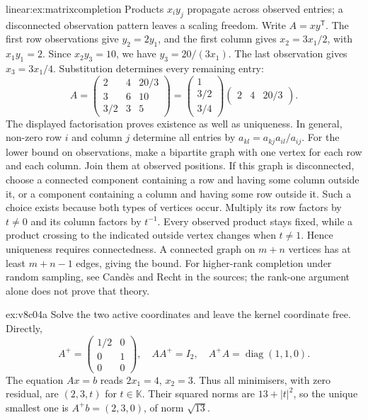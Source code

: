 \begin{solution}{linear:ex:matrixcompletion}
\idea Products $x_iy_j$ propagate across observed entries; a disconnected observation pattern leaves a scaling freedom.
\writeup Write $A=xy^{\mathsf T}$. The first row observations give $y_2=2y_1$, and the first column gives $x_2=3x_1/2$, with $x_1y_1=2$. Since $x_2y_3=10$, we have $y_3=20/(3x_1)$. The last observation gives $x_3=3x_1/4$. Substitution determines every remaining entry:
\[
A=\begin{pmatrix}2&4&20/3\\3&6&10\\3/2&3&5\end{pmatrix}
=\begin{pmatrix}1\\3/2\\3/4\end{pmatrix}\begin{pmatrix}2&4&20/3\end{pmatrix}.
\]
The displayed factorisation proves existence as well as uniqueness.
In general, non-zero row $i$ and column $j$ determine all entries by $a_{kl}=a_{kj}a_{il}/a_{ij}$. For the lower bound on observations, make a bipartite graph with one vertex for each row and each column. Join them at observed positions. If this graph is disconnected, choose a connected component containing a row and having some column outside it, or a component containing a column and having some row outside it. Such a choice exists because both types of vertices occur. Multiply its row factors by $t\ne0$ and its column factors by $t^{-1}$. Every observed product stays fixed, while a product crossing to the indicated outside vertex changes when $t\ne1$. Hence uniqueness requires connectedness. A connected graph on $m+n$ vertices has at least $m+n-1$ edges, giving the bound. For higher-rank completion under random sampling, see Cand\`es and Recht in the sources; the rank-one argument alone does not prove that theory.
\end{solution}

\begin{solution}{ex:v8c04a}
\idea Solve the two active coordinates and leave the kernel coordinate free.
\writeup Directly,
\[
A^+=\begin{pmatrix}1/2&0\\0&1\\0&0\end{pmatrix},\quad
AA^+=I_2,\quad A^+A=\operatorname{diag}(1,1,0).
\]
The equation $Ax=b$ reads $2x_1=4$, $x_2=3$. Thus all minimisers, with zero residual, are $(2,3,t)$ for $t\in\mathbb K$. Their squared norms are $13+|t|^2$, so the unique smallest one is $A^+b=(2,3,0)$, of norm $\sqrt{13}$.
\end{solution}


